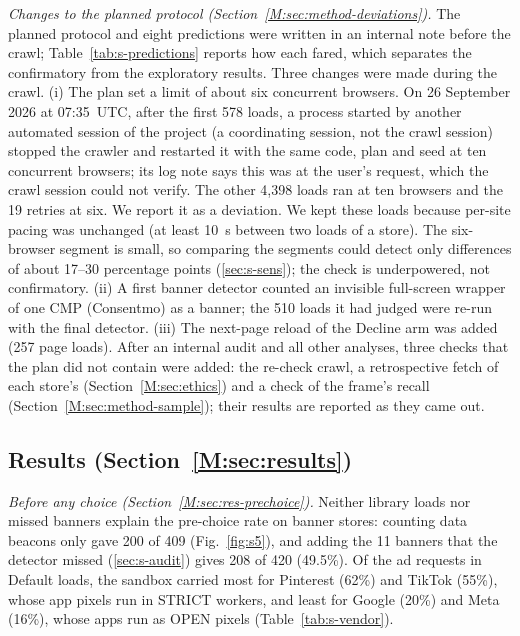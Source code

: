 \documentclass[preprint,11pt,authoryear,a4paper]{elsarticle}
\begin{document}
\emph{Changes to the planned protocol (Section~\ref*{M:sec:method-deviations}).} The planned protocol and eight predictions were written in an internal note before the crawl; Table~\ref{tab:s-predictions} reports how each fared, which separates the confirmatory from the exploratory results. Three changes were made during the crawl. (i) The plan set a limit of about six concurrent browsers. On 26 September 2026 at 07:35~UTC, after the first 578 loads, a process started by another automated session of the project (a coordinating session, not the crawl session) stopped the crawler and restarted it with the same code, plan and seed at ten concurrent browsers; its log note says this was at the user's request, which the crawl session could not verify. The other 4,398 loads ran at ten browsers and the 19 retries at six. We report it as a deviation. We kept these loads because per-site pacing was unchanged (at least 10~s between two loads of a store). The six-browser segment is small, so comparing the segments could detect only differences of about 17--30 percentage points (\ref{sec:s-sens}); the check is underpowered, not confirmatory. (ii) A first banner detector counted an invisible full-screen wrapper of one CMP (Consentmo) as a banner; the 510 loads it had judged were re-run with the final detector. (iii) The next-page reload of the Decline arm was added (257 page loads). After an internal audit and all other analyses, three checks that the plan did not contain were added: the re-check crawl, a retrospective fetch of each store's  (Section~\ref*{M:sec:ethics}) and a check of the frame's recall (Section~\ref*{M:sec:method-sample}); their results are reported as they came out.

\subsection*{Results (Section~\ref*{M:sec:results})}

\emph{Before any choice (Section~\ref*{M:sec:res-prechoice}).} Neither library loads nor missed banners explain the pre-choice rate on banner stores: counting data beacons only gave 200 of 409 (Fig.~\ref{fig:s5}), and adding the 11 banners that the detector missed (\ref{sec:s-audit}) gives 208 of 420 (49.5\%). Of the ad requests in Default loads, the sandbox carried most for Pinterest (62\%) and TikTok (55\%), whose app pixels run in STRICT workers, and least for Google (20\%) and Meta (16\%), whose apps run as OPEN pixels (Table~\ref{tab:s-vendor}).
\end{document}
